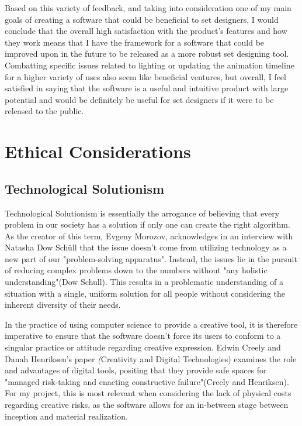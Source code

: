 \documentclass[10pt,twocolumn]{article}
\begin{document}
Based on this variety of feedback, and taking into consideration one of my main goals of creating a software that could be beneficial to set designers, I would conclude that the overall high satisfaction with the product's features and how they work means that I have the framework for a software that could be improved upon in the future to be released as a more robust set designing tool. Combatting specific issues related to lighting or updating the animation timeline for a higher variety of uses also seem like beneficial ventures, but overall, I feel satisfied in saying that the software is a useful and intuitive product with large potential and would be definitely be useful for set designers if it were to be released to the public. 
\section{Ethical Considerations}
\subsection{Technological Solutionism}
Technological Solutionism is essentially the arrogance of believing that every problem in our society has a solution if only one can create the right algorithm. As the creator of this term, Evgeny Morozov, acknowledges in an interview with Natasha Dow Schüll that the issue doesn't come from utilizing technology as a new part of our "problem-solving apparatus". Instead, the issues lie in the pursuit of reducing complex problems down to the numbers without "any holistic understanding"(Dow Schull). This results in a problematic understanding of a situation with a single, uniform solution for all people without considering the inherent diversity of their needs.

In the practice of using computer science to provide a creative tool, it is therefore imperative to ensure that the software doesn't force its users to conform to a singular practice or attitude regarding creative expression. Edwin Creely and Danah Henriksen's paper \textit(Creativity and Digital Technologies) examines the role and advantages of digital tools, positing that they provide safe spaces for "managed risk-taking and enacting constructive failure"(Creely and Henriksen). For my project, this is most relevant when considering the lack of physical costs regarding creative risks, as the software allows for an in-between stage between inception and material realization. 
\end{document}
